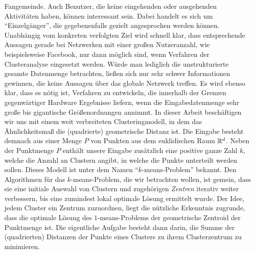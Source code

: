 Fangemeinde. Auch Benutzer, die keine eingehenden oder ausgehenden Aktivitäten haben, können interessant sein. Dabei handelt es sich
um "`Einzelgänger"', die gegebenenfalls gezielt angesprochen werden können. Unabhängig vom konkreten verfolgten Ziel wird schnell
klar, dass entsprechende Aussagen gerade bei Netzwerken mit einer großen Nutzeranzahl, wie beispielsweise Facebook, nur dann
möglich sind, wenn Verfahren der Clusteranalyse eingesetzt werden. Würde man lediglich die unstrukturierte gesamte Datenmenge
betrachten, ließen sich nur sehr schwer Informationen gewinnen, die keine Aussagen über das globale Netzwerk treffen. Es wird
ebenso klar, dass es nötig ist, Verfahren zu entwickeln, die innerhalb der Grenzen gegenwärtiger Hardware Ergebnisse liefern, wenn
die Eingabedatenmenge sehr große bis gigantische Größenordnungen annimmt.
\absatz
In dieser Arbeit beschäftigen wir uns mit einem weit verbreiteten Clusteringmodell, in dem das Ähnlichkeitsmaß die
(quadrierte) geometrische Distanz ist. Die Eingabe besteht demnach aus einer Menge $P$ von Punkten aus dem euklidischen Raum
$\mathbb{R}^{d}$. Neben der Punktmenge $P$ enthält unsere Eingabe zusätzlich eine positive ganze Zahl $k$, welche die Anzahl an Clustern
angibt, in welche die Punkte unterteilt werden sollen. Dieses Modell ist unter dem Namen "`$k$-means-Problem"' bekannt. Den
Algorithmen für das $k$-means-Problem, die wir betrachten wollen, ist gemein, dass sie eine initiale Auswahl
von Clustern und zugehörigen \emph{Zentren} iterativ weiter verbessern, bis eine zumindest lokal optimale Lösung ermittelt wurde.
Der Idee, jedem Cluster ein Zentrum zuzuordnen, liegt die nützliche Erkenntnis zugrunde, dass die optimale Lösung des
$1$-means-Problems der geometrische Zentroid der Punktmenge ist. Die eigentliche Aufgabe besteht dann darin, die Summe der
(quadrierten) Distanzen der Punkte eines Clusters zu ihrem Clusterzentrum zu minimieren.

